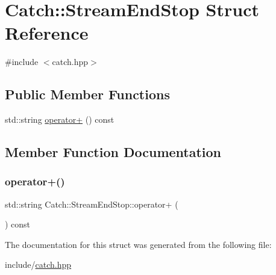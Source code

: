 \hypertarget{struct_catch_1_1_stream_end_stop}{}\section{Catch\+::Stream\+End\+Stop Struct Reference}
\label{struct_catch_1_1_stream_end_stop}


{\ttfamily \#include $<$catch.\+hpp$>$}

\subsection*{Public Member Functions}
\begin{DoxyCompactItemize}
\item 
std\+::string \mbox{\hyperlink{struct_catch_1_1_stream_end_stop_a4a518f0342a381074821d5bda2651401}{operator+}} () const
\end{DoxyCompactItemize}


\subsection{Member Function Documentation}
\mbox{\label{struct_catch_1_1_stream_end_stop_a4a518f0342a381074821d5bda2651401}} 
\subsubsection{\texorpdfstring{operator+()}{operator+()}}
{\footnotesize\ttfamily std\+::string Catch\+::\+Stream\+End\+Stop\+::operator+ (\begin{DoxyParamCaption}{ }\end{DoxyParamCaption}) const}



The documentation for this struct was generated from the following file\+:\begin{DoxyCompactItemize}
\item 
include/\mbox{\hyperlink{catch_8hpp}{catch.\+hpp}}\end{DoxyCompactItemize}
